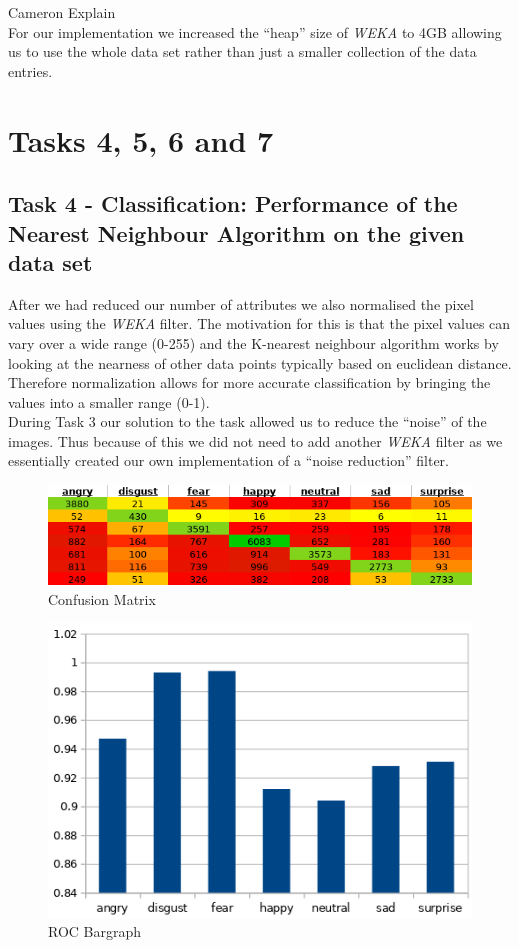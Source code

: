 \documentclass[12pt]{article}
\begin{document}
Cameron Explain\\

For our implementation we increased the “heap” size of \textit{WEKA} to 4GB allowing us to use the whole data set rather than just a smaller collection of the data entries.\\ 


\section{Tasks 4, 5, 6 and 7}

\subsection{Task 4 - Classification: Performance of the Nearest Neighbour Algorithm on the given data set}

After we had reduced our number of attributes we also normalised the pixel values using the \textit{WEKA} filter. The motivation for this is that the pixel values can vary over a wide range (0-255) and the K-nearest neighbour algorithm works by looking at the nearness of other data points typically based on euclidean distance. Therefore normalization allows for more accurate classification by bringing the values into a smaller range (0-1).\\

During Task 3 our solution to the task allowed us to reduce the “noise” of the images. Thus because of this we did not need to add another \textit{WEKA} filter as we essentially created our own implementation of a “noise reduction” filter.\\ 

\begin{figure}[H]
	\centering
	\includegraphics[width=0.7\linewidth]{images/heatmap}
	\caption{Confusion Matrix}
	\label{fig:heatmap}
\end{figure}

\begin{figure}[H]
	\centering
	\includegraphics[width=0.5\linewidth]{images/roc_graph}
	\caption{ROC Bargraph}
	\label{fig:roc_graph}
\end{figure}
\end{document}
